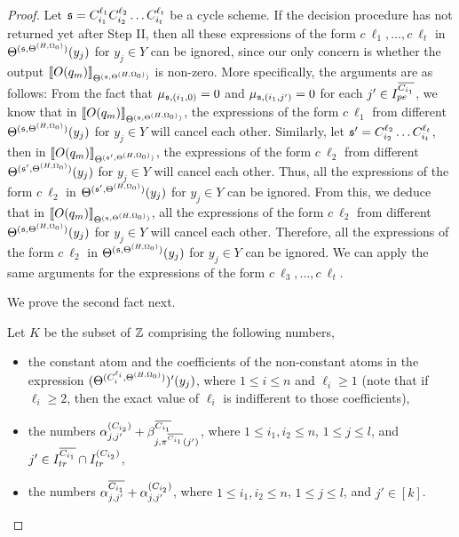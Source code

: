 \begin{appendix}
\begin{proof}
Let ${\mathfrak{s} }=C_{i_1}^{\ell_1} C_{i_2}^{\ell_2} \dots C_{i_t}^{\ell_t}$ be a cycle scheme. If the decision procedure has not returned yet after Step II, then all these expressions of the form $c\ \ell_1,\dots, c\ \ell_t$ in $\Theta^{({\mathfrak{s} }, \Theta^{(H,\Omega_0)})}(y_j)$ for $y_j \in Y$ can be ignored, since our only concern is whether the output $\llbracket O(q_m)\rrbracket_{\Theta^{({\mathfrak{s} }, \Theta^{(H,\Omega_0)})}}$ is non-zero. More specifically, the arguments are as follows: From the fact that  $\mu_{{\mathfrak{s} },(i_1,0)}=0$ and $\mu_{{\mathfrak{s} },(i_1,j')}=0$ for each $j' \in I^{\overline{C_{i_1}}}_{pe}$, we know that in $\llbracket O(q_m)\rrbracket_{\Theta^{({\mathfrak{s} }, \Theta^{(H,\Omega_0)})}}$, the  expressions of the form $c\ \ell_1$ from different $\Theta^{({\mathfrak{s} }, \Theta^{(H,\Omega_0)})}(y_j)$ for $y_j \in Y$ will cancel each other. Similarly, let ${\mathfrak{s} }' = C_{i_2}^{\ell_2} \dots C_{i_t}^{\ell_t}$, then in $\llbracket O(q_m)\rrbracket_{\Theta^{({\mathfrak{s} }', \Theta^{(H,\Omega_0)})}}$, the  expressions of the form $c\ \ell_2$ from different $\Theta^{({\mathfrak{s} }', \Theta^{(H,\Omega_0)})}(y_j)$ for $y_j \in Y$ will cancel each other. Thus, all the expressions of the form $c\ \ell_2$ in $\Theta^{({\mathfrak{s} }', \Theta^{(H,\Omega_0)})}(y_j)$ for $y_j \in Y$ can be ignored. From this, we deduce that in $\llbracket O(q_m)\rrbracket_{\Theta^{({\mathfrak{s} }, \Theta^{(H,\Omega_0)})}}$, all the expressions of the form $c\ \ell_2$ from different $\Theta^{({\mathfrak{s} }, \Theta^{(H,\Omega_0)})}(y_j)$ for $y_j \in Y$ will cancel each other. Therefore, all the expressions of the form $c\ \ell_2$ in $\Theta^{({\mathfrak{s} }, \Theta^{(H,\Omega_0)})}(y_j)$ for $y_j \in Y$ can be ignored. We can apply the same arguments for the expressions of the form $c\ \ell_3,\dots,c\ \ell_t$.

\medskip

We prove the second fact next. 

Let $K$ be the subset of ${\mathbb{Z} }$ comprising the following numbers,
\begin{itemize}
\item the constant atom and the coefficients of the non-constant atoms in the expression $(\Theta^{(C^{\ell_i}_{i}, \Theta^{(H,\Omega_0)})})'(y_j)$, where $1 \le i \le n$ and $\ell_i \ge 1$ (note that if $\ell_i \ge 2$, then the exact value of $\ell_i$ is indifferent to those coefficients),

%
\item  the numbers $\alpha^{(C_{i_2})}_{j,j'} + \beta^{\overline{C_{i_1}}}_{j,\pi^{\overline{C_{i_1}}}(j')}$, where $1 \le i_1,i_2 \le n$,  $1 \le j \le l$, and $j' \in I^{\overline{C_{i_1}}}_{tr} \cap I^{(C_{i_2})}_{tr}$,
%
\item  the numbers $\alpha^{\overline{C_{i_1}}}_{j, j'} + \alpha^{(C_{i_2})}_{j,j'}$, where $1 \le i_1,i_2 \le n$, $1 \le j \le l$, and $j' \in [k]$. 
\end{itemize}


\end{proof}
\end{appendix}
